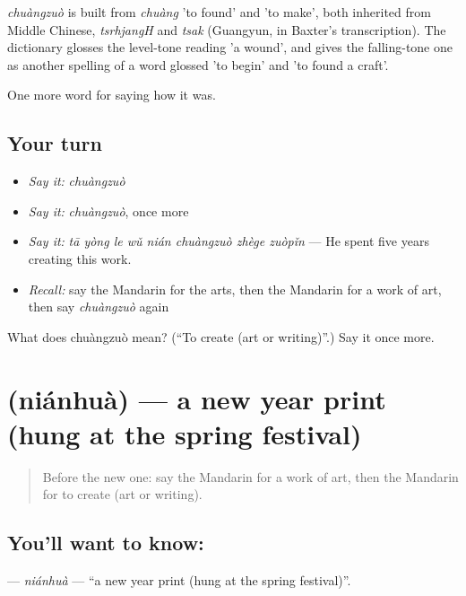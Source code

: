 \begin{cousinweb}
\emph{chuàngzuò} is built from \emph{chuàng} 'to found' and  'to make', both inherited from Middle Chinese, \emph{tsrhjangH} and \emph{tsak} (Guangyun, in Baxter's transcription). The dictionary glosses the level-tone reading 'a wound', and gives the falling-tone one as another spelling of a word glossed 'to begin' and 'to found a craft'.
\end{cousinweb}

\begin{grammarlens}[title={What you've built}]
One more word for saying how it was.
\end{grammarlens}

\subsection*{Your turn}
\begin{itemize}
\raggedright
  \item \emph{Say it:} \emph{chuàngzuò}
  \item \emph{Say it:} \emph{chuàngzuò}, once more
  \item \emph{Say it:} \emph{tā yòng le wǔ nián chuàngzuò zhège zuòpǐn} — He spent five years creating this work.
  \item \emph{Recall:} say the Mandarin for the arts, then the Mandarin for a work of art, then say \emph{chuàngzuò} again
\end{itemize}

\begin{tcolorbox}[breakable,colback=teal!4,colframe=teal!35!black,title={Before you move on}]
What does chuàngzuò mean? (\textquotedblleft{}To create (art or writing)\textquotedblright{}.) Say it once more.
\end{tcolorbox}
\section[\texorpdfstring{\zh{年画} (niánhuà)}{年画 (niánhuà)}]{ (niánhuà) — a new year print (hung at the spring festival)}

\label{lesson:ZH-C503-nianhua}



\begin{quote}
Before the new one: say the Mandarin for a work of art, then the Mandarin for to create (art or writing).
\end{quote}

\subsection*{You'll want to know: }
\textbf{} — \emph{niánhuà} — \textquotedblleft{}a new year print (hung at the spring festival)\textquotedblright{}.

